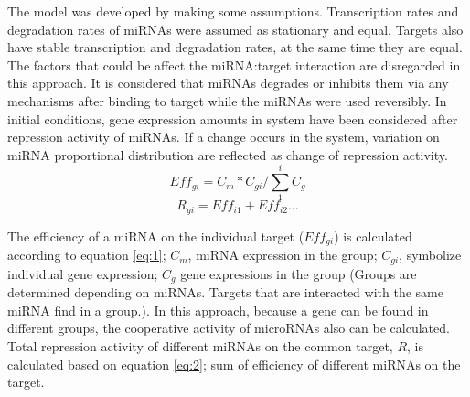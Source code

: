 \documentclass[]{article}
\begin{document}
The model was developed by making some assumptions. Transcription rates
and degradation rates of miRNAs were assumed as stationary and equal.
Targets also have stable transcription and degradation rates, at the
same time they are equal. The factors that could be affect the
miRNA:target interaction are disregarded in this approach. It is
considered that miRNAs degrades or inhibits them via any mechanisms
after binding to target while the miRNAs were used reversibly. In
initial conditions, gene expression amounts in system have been
considered after repression activity of miRNAs. If a change occurs in
the system, variation on miRNA proportional distribution are reflected
as change of repression activity. \begin{equation} 
    Eff_{gi}= C_m * C_{gi}/\sum_{1}^{i} C_g \tag{1}\label{eq:1}
\end{equation} \begin{equation}
   R_{gi}= Eff_{i1}+ Eff_{i2} ... \tag{2}\label{eq:2}
\end{equation}

The efficiency of a miRNA on the individual target (\(Eff_{gi}\)) is
calculated according to equation \eqref{eq:1}; \(C_m\), miRNA expression
in the group; \(C_{gi}\), symbolize individual gene expression; \(C_g\)
gene expressions in the group (Groups are determined depending on
miRNAs. Targets that are interacted with the same miRNA find in a
group.). In this approach, because a gene can be found in different
groups, the cooperative activity of microRNAs also can be calculated.
Total repression activity of different miRNAs on the common target,
\(R\), is calculated based on equation \eqref{eq:2}; sum of efficiency
of different miRNAs on the target.
\end{document}
